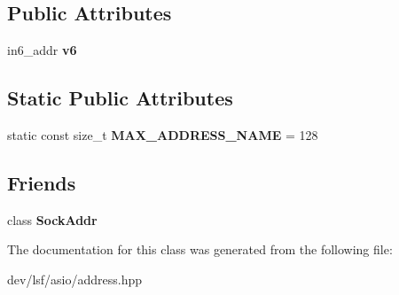\subsection*{Public Attributes}
\begin{DoxyCompactItemize}
\item 
\hypertarget{classlsf_1_1asio_1_1Address_a6df187231e43ada66899b6732dd836c8}{
in6\_\-addr {\bfseries v6}}
\label{classlsf_1_1asio_1_1Address_a6df187231e43ada66899b6732dd836c8}

\end{DoxyCompactItemize}
\subsection*{Static Public Attributes}
\begin{DoxyCompactItemize}
\item 
\hypertarget{classlsf_1_1asio_1_1Address_a4a73705d91e7b6061f5744e7f6bbb199}{
static const size\_\-t {\bfseries MAX\_\-ADDRESS\_\-NAME} = 128}
\label{classlsf_1_1asio_1_1Address_a4a73705d91e7b6061f5744e7f6bbb199}

\end{DoxyCompactItemize}
\subsection*{Friends}
\begin{DoxyCompactItemize}
\item 
\hypertarget{classlsf_1_1asio_1_1Address_a271a088efb4aac8a7b62d5efcceaa1ac}{
class {\bfseries SockAddr}}
\label{classlsf_1_1asio_1_1Address_a271a088efb4aac8a7b62d5efcceaa1ac}

\end{DoxyCompactItemize}


The documentation for this class was generated from the following file:\begin{DoxyCompactItemize}
\item 
dev/lsf/asio/address.hpp\end{DoxyCompactItemize}
